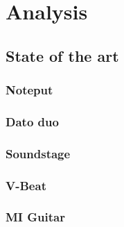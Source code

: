 \chapter{Analysis}


\section{State of the art}
	\subsection{Noteput}
		
	\subsection{Dato duo}
		
	\subsection{Soundstage}
		
	\subsection{V-Beat}
		
	\subsection{MI Guitar}
		
